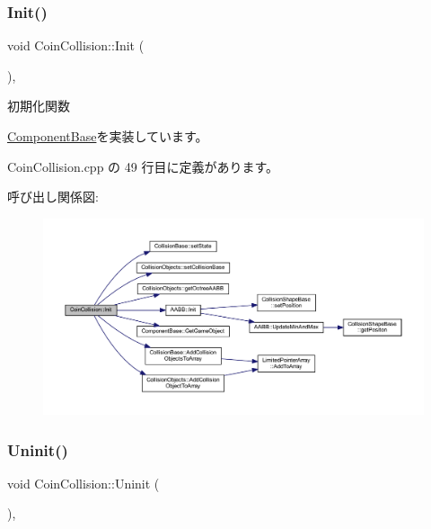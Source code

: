 \subsubsection{\texorpdfstring{Init()}{Init()}}
{\footnotesize\ttfamily void Coin\+Collision\+::\+Init (\begin{DoxyParamCaption}{ }\end{DoxyParamCaption})\hspace{0.3cm}{\ttfamily [override]}, {\ttfamily [virtual]}}



初期化関数 



\mbox{\hyperlink{class_component_base_a125939d6befe42f28886a6523e86b18b}{Component\+Base}}を実装しています。



 Coin\+Collision.\+cpp の 49 行目に定義があります。

呼び出し関係図\+:\nopagebreak
\begin{figure}[H]
\begin{center}
\leavevmode
\includegraphics[width=350pt]{class_coin_collision_a4119a7decab2410a4ada3568ad0c132d_cgraph}
\end{center}
\end{figure}
\mbox{\label{class_coin_collision_aa852afdcdbedcf82809df9c7fd99be9e}} 
\subsubsection{\texorpdfstring{Uninit()}{Uninit()}}
{\footnotesize\ttfamily void Coin\+Collision\+::\+Uninit (\begin{DoxyParamCaption}{ }\end{DoxyParamCaption})\hspace{0.3cm}{\ttfamily [override]}, {\ttfamily [virtual]}}



